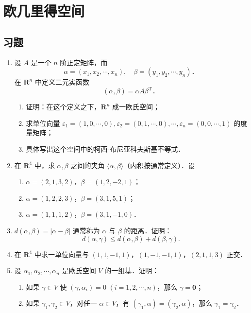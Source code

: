\chapter{欧几里得空间}

\section{习题}

\begin{enumerate}
  \item 设 $A$ 是一个 $n$ 阶正定矩阵，而
  \[
  \alpha=(x_1,x_2,\cdots,x_n),\quad \beta=(y_1,y_2,\cdots,y_n)\text{．}
  \]
  在 $\mathbf{R}^n$ 中定义二元实函数
  \[
  (\alpha,\beta)=\alpha A\beta^{\mathrm{T}}\text{．}
  \]
  \begin{enumerate}
    \item 证明：在这个定义之下，$\mathbf{R}^n$ 成一欧氏空间；
  \anssub
    \item 求单位向量 $\varepsilon_1=(1,0,\cdots,0),\varepsilon_2=(0,1,\cdots,0),\cdots,\varepsilon_n=(0,0,\cdots,1)$ 的度量矩阵；
  \anssub
    \item 具体写出这个空间中的柯西-布尼亚科夫斯基不等式．
  \anssub
  \end{enumerate}

  \item 在 $\mathbf{R}^4$ 中，求 $\alpha,\beta$ 之间的夹角 $\langle\alpha,\beta\rangle$（内积按通常定义）．设
  \begin{enumerate}
    \item $\alpha=(2,1,3,2)$，$\beta=(1,2,-2,1)$；
  \anssub
    \item $\alpha=(1,2,2,3)$，$\beta=(3,1,5,1)$；
  \anssub
    \item $\alpha=(1,1,1,2)$，$\beta=(3,1,-1,0)$．
  \anssub
  \end{enumerate}

  \item $d(\alpha,\beta)=|\alpha-\beta|$ 通常称为 $\alpha$ 与 $\beta$ 的距离．证明：
  \[
  d(\alpha,\gamma)\le d(\alpha,\beta)+d(\beta,\gamma).
  \]

  \ansproof
  \item 在 $\mathbf{R}^4$ 中求一单位向量与 $(1,1,-1,1)$，$(1,-1,-1,1)$，$(2,1,1,3)$ 正交．

  \anscompute
  \item 设 $\alpha_1,\alpha_2,\cdots,\alpha_n$ 是欧氏空间 $V$ 的一组基．证明：
  \begin{enumerate}
    \item 如果 $\gamma\in V$ 使 $(\gamma,\alpha_i)=0$ $(i=1,2,\cdots,n)$，那么 $\gamma=\mathbf{0}$；
  \anssub
    \item 如果 $\gamma_1,\gamma_2\in V$，对任一 $\alpha\in V$，有 $(\gamma_1,\alpha)=(\gamma_2,\alpha)$，那么 $\gamma_1=\gamma_2$．
  \anssub
  \end{enumerate}


\end{enumerate}
